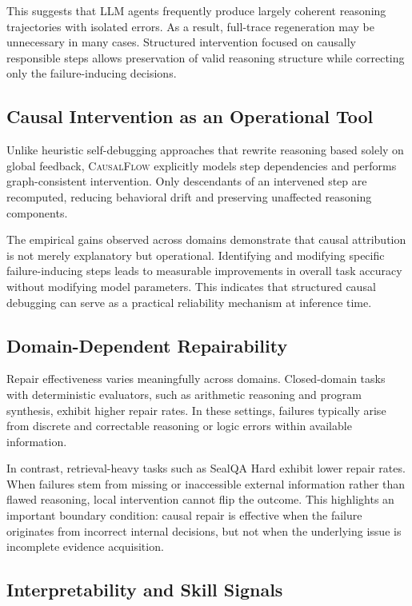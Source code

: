 \documentclass{article}
\theoremstyle{plain}
\theoremstyle{definition}
\theoremstyle{remark}
\begin{document}
This suggests that LLM agents frequently produce largely coherent reasoning trajectories with isolated errors. As a result, full-trace regeneration may be unnecessary in many cases. Structured intervention focused on causally responsible steps allows preservation of valid reasoning structure while correcting only the failure-inducing decisions.

\subsection{Causal Intervention as an Operational Tool}

Unlike heuristic self-debugging approaches that rewrite reasoning based solely on global feedback, \textsc{CausalFlow} explicitly models step dependencies and performs graph-consistent intervention. Only descendants of an intervened step are recomputed, reducing behavioral drift and preserving unaffected reasoning components.

The empirical gains observed across domains demonstrate that causal attribution is not merely explanatory but operational. Identifying and modifying specific failure-inducing steps leads to measurable improvements in overall task accuracy without modifying model parameters. This indicates that structured causal debugging can serve as a practical reliability mechanism at inference time.

\subsection{Domain-Dependent Repairability}

Repair effectiveness varies meaningfully across domains. Closed-domain tasks with deterministic evaluators, such as arithmetic reasoning and program synthesis, exhibit higher repair rates. In these settings, failures typically arise from discrete and correctable reasoning or logic errors within available information.

In contrast, retrieval-heavy tasks such as SealQA Hard exhibit lower repair rates. When failures stem from missing or inaccessible external information rather than flawed reasoning, local intervention cannot flip the outcome. This highlights an important boundary condition: causal repair is effective when the failure originates from incorrect internal decisions, but not when the underlying issue is incomplete evidence acquisition.

\subsection{Interpretability and Skill Signals}
\end{document}
